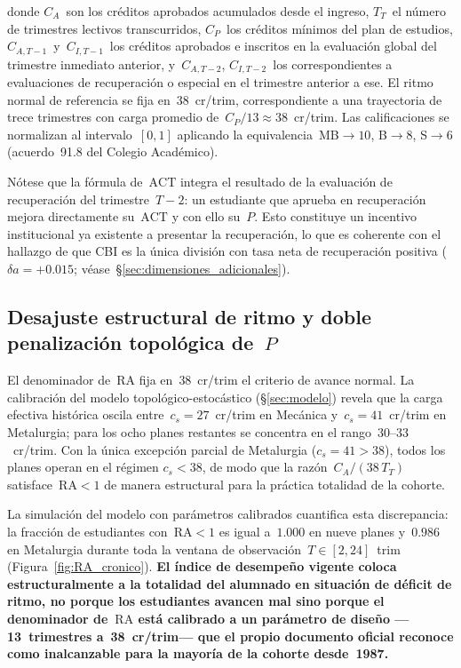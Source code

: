 \documentclass[11pt,letterpaper]{article}
\begin{document}
donde $C_A$~son los créditos aprobados acumulados desde el ingreso, $T_T$~el
número de trimestres lectivos transcurridos, $C_P$~los créditos mínimos del
plan de estudios, $C_{A,T-1}$~y~$C_{I,T-1}$~los créditos aprobados e
inscritos en la evaluación global del trimestre inmediato anterior,
y~$C_{A,T-2}$, $C_{I,T-2}$~los correspondientes a evaluaciones de
recuperación o especial en el trimestre anterior a ese.
El ritmo normal de referencia se fija en~$38$~cr/trim, correspondiente a una
trayectoria de trece trimestres con carga promedio de~$C_P/13\approx38$~cr/trim.
Las calificaciones se normalizan al intervalo~$[0,1]$ aplicando la
equivalencia~MB$\to10$, B$\to8$, S$\to6$ (acuerdo~91.8 del Colegio Académico).

Nótese que la fórmula de~$\mathrm{ACT}$ integra el resultado de la evaluación
de recuperación del trimestre~$T-2$: un estudiante que aprueba en recuperación
mejora directamente su~$\mathrm{ACT}$ y con ello su~$P$.
Esto constituye un incentivo institucional ya existente a presentar la
recuperación, lo que es coherente con el hallazgo de que CBI es la única
división con tasa neta de recuperación positiva
($\delta a = +0.015$; véase~\S\ref{sec:dimensiones_adicionales}).

\subsection{Desajuste estructural de ritmo y doble penalización topológica de~\texorpdfstring{$P$}{P}}
\label{sec:RA_cronico}

El denominador de~$\mathrm{RA}$ fija en~$38$~cr/trim el criterio de avance
normal.
La calibración del modelo topológico-estocástico
(\S\ref{sec:modelo}) revela que la carga efectiva histórica oscila
entre~$c_s=27$~cr/trim en Mecánica y~$c_s=41$~cr/trim en Metalurgia;
para los ocho planes restantes se concentra en el rango~$30$--$33$~cr/trim.
Con la única excepción parcial de Metalurgia
($c_s=41 > 38$), todos los planes operan en el régimen $c_s < 38$, de modo
que la razón~$C_A/(38\,T_T)$ satisface~$\mathrm{RA}<1$ de manera estructural
para la práctica totalidad de la cohorte.

La simulación del modelo con parámetros calibrados cuantifica esta
discrepancia: la fracción de estudiantes con~$\mathrm{RA}<1$ es igual a~$1.000$
en nueve planes y~$0.986$ en Metalurgia durante toda la ventana de
observación~$T\in[2,24]$~trim (Figura~\ref{fig:RA_cronico}).
\textbf{El índice de desempeño vigente coloca estructuralmente a la totalidad
del alumnado en situación de déficit de ritmo, no porque los estudiantes
avancen mal sino porque el denominador de~$\mathrm{RA}$ está calibrado a un
parámetro de diseño ---13~trimestres a~38~cr/trim--- que el propio documento
oficial reconoce como inalcanzable para la mayoría de la cohorte desde~1987.}
\end{document}
